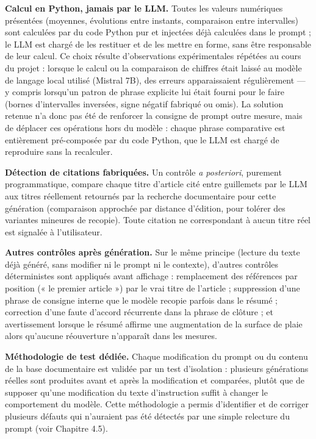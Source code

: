 \documentclass[12pt,a4paper]{report}
\begin{document}
\textbf{Calcul en Python, jamais par le LLM.} Toutes les valeurs numériques présentées (moyennes, évolutions entre instants, comparaison entre intervalles) sont calculées par du code Python pur et injectées déjà calculées dans le prompt ; le LLM est chargé de les restituer et de les mettre en forme, sans être responsable de leur calcul. Ce choix résulte d'observations expérimentales répétées au cours du projet : lorsque le calcul ou la comparaison de chiffres était laissé au modèle de langage local utilisé (Mistral 7B), des erreurs apparaissaient régulièrement --- y compris lorsqu'un patron de phrase explicite lui était fourni pour le faire (bornes d'intervalles inversées, signe négatif fabriqué ou omis). La solution retenue n'a donc pas été de renforcer la consigne de prompt outre mesure, mais de déplacer ces opérations hors du modèle : chaque phrase comparative est entièrement pré-composée par du code Python, que le LLM est chargé de reproduire sans la recalculer.

\textbf{Détection de citations fabriquées.} Un contrôle \textit{a posteriori}, purement programmatique, compare chaque titre d'article cité entre guillemets par le LLM aux titres réellement retournés par la recherche documentaire pour cette génération (comparaison approchée par distance d'édition, pour tolérer des variantes mineures de recopie). Toute citation ne correspondant à aucun titre réel est signalée à l'utilisateur.

\textbf{Autres contrôles après génération.} Sur le même principe (lecture du texte déjà généré, sans modifier ni le prompt ni le contexte), d'autres contrôles déterministes sont appliqués avant affichage : remplacement des références par position (« le premier article ») par le vrai titre de l'article ; suppression d'une phrase de consigne interne que le modèle recopie parfois dans le résumé ; correction d'une faute d'accord récurrente dans la phrase de clôture ; et avertissement lorsque le résumé affirme une augmentation de la surface de plaie alors qu'aucune réouverture n'apparaît dans les mesures.

\textbf{Méthodologie de test dédiée.} Chaque modification du prompt ou du contenu de la base documentaire est validée par un test d'isolation : plusieurs générations réelles sont produites avant et après la modification et comparées, plutôt que de supposer qu'une modification du texte d'instruction suffit à changer le comportement du modèle. Cette méthodologie a permis d'identifier et de corriger plusieurs défauts qui n'auraient pas été détectés par une simple relecture du prompt (voir Chapitre 4.5).
\end{document}
